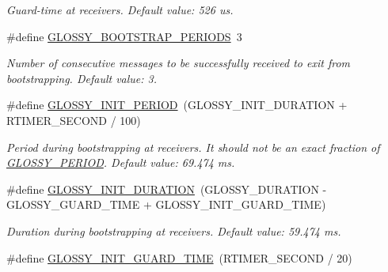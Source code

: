 \begin{DoxyCompactItemize}
\begin{DoxyCompactList}\small\item\em Guard-\/time at receivers. Default value: 526 us. \end{DoxyCompactList}\item 
\hypertarget{group__glossy-test-settings_ga8c2dcd42a2c913f0f80525a7c2eac3f1}{
\#define \hyperlink{group__glossy-test-settings_ga8c2dcd42a2c913f0f80525a7c2eac3f1}{GLOSSY\_\-BOOTSTRAP\_\-PERIODS}~3}
\label{group__glossy-test-settings_ga8c2dcd42a2c913f0f80525a7c2eac3f1}

\begin{DoxyCompactList}\small\item\em Number of consecutive messages to be successfully received to exit from bootstrapping. Default value: 3. \end{DoxyCompactList}\item 
\hypertarget{group__glossy-test-settings_ga21f18e3204161cd2b12f9979a28376f2}{
\#define \hyperlink{group__glossy-test-settings_ga21f18e3204161cd2b12f9979a28376f2}{GLOSSY\_\-INIT\_\-PERIOD}~(GLOSSY\_\-INIT\_\-DURATION + RTIMER\_\-SECOND / 100)}
\label{group__glossy-test-settings_ga21f18e3204161cd2b12f9979a28376f2}

\begin{DoxyCompactList}\small\item\em Period during bootstrapping at receivers. It should not be an exact fraction of \hyperlink{group__glossy-test-settings_ga6f68058577fdbfccbd8e50537609a5e4}{GLOSSY\_\-PERIOD}. Default value: 69.474 ms. \end{DoxyCompactList}\item 
\hypertarget{group__glossy-test-settings_gaa096b07a5e769ee16ce1e872b8fa9e96}{
\#define \hyperlink{group__glossy-test-settings_gaa096b07a5e769ee16ce1e872b8fa9e96}{GLOSSY\_\-INIT\_\-DURATION}~(GLOSSY\_\-DURATION -\/ GLOSSY\_\-GUARD\_\-TIME + GLOSSY\_\-INIT\_\-GUARD\_\-TIME)}
\label{group__glossy-test-settings_gaa096b07a5e769ee16ce1e872b8fa9e96}

\begin{DoxyCompactList}\small\item\em Duration during bootstrapping at receivers. Default value: 59.474 ms. \end{DoxyCompactList}\item 
\hypertarget{group__glossy-test-settings_gab6849986e590b8cd21c92f20901433ee}{
\#define \hyperlink{group__glossy-test-settings_gab6849986e590b8cd21c92f20901433ee}{GLOSSY\_\-INIT\_\-GUARD\_\-TIME}~(RTIMER\_\-SECOND / 20)}
\label{group__glossy-test-settings_gab6849986e590b8cd21c92f20901433ee}


\end{DoxyCompactItemize}
